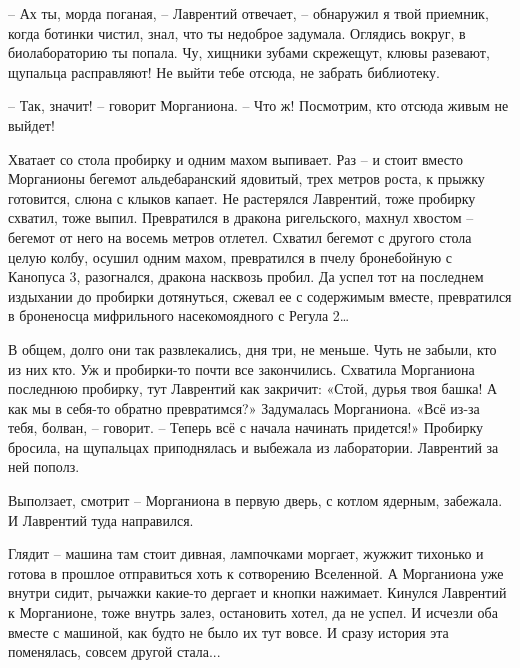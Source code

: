 \documentclass[ebook,oneside,final,openright]{memoir}
\begin{document}
– Ах ты, морда поганая, – Лаврентий отвечает, – обнаружил я твой приемник, когда ботинки чистил, знал, что ты недоброе задумала. Оглядись вокруг, в биолабораторию ты попала. Чу, хищники зубами скрежещут, клювы разевают, щупальца расправляют! Не выйти тебе отсюда, не забрать библиотеку.\par
– Так, значит! – говорит Морганиона. – Что ж! Посмотрим, кто отсюда живым не выйдет!\par
\par
Хватает со стола пробирку и одним махом выпивает. Раз – и стоит вместо Морганионы бегемот альдебаранский ядовитый, трех метров роста, к прыжку готовится, слюна с клыков капает. Не растерялся Лаврентий, тоже пробирку схватил, тоже выпил. Превратился в дракона ригельского, махнул хвостом – бегемот от него на восемь метров отлетел. Схватил бегемот с другого стола целую колбу, осушил одним махом, превратился в пчелу бронебойную с Канопуса 3, разогнался, дракона насквозь пробил. Да успел тот на последнем издыхании до пробирки дотянуться, сжевал ее с содержимым вместе, превратился в броненосца мифрильного насекомоядного с Регула 2…\par
\par
В общем, долго они так развлекались, дня три, не меньше. Чуть не забыли, кто из них кто. Уж и пробирки-то почти все закончились. Схватила Морганиона последнюю пробирку, тут Лаврентий как закричит: «Стой, дурья твоя башка! А как мы в себя-то обратно превратимся?» Задумалась Морганиона. «Всё из-за тебя, болван, – говорит. – Теперь всё с начала начинать придется!» Пробирку бросила, на щупальцах приподнялась и выбежала из лаборатории. Лаврентий за ней пополз.\par
\par
Выползает, смотрит – Морганиона в первую дверь, с котлом ядерным, забежала. И Лаврентий туда направился.\par
\par
Глядит – машина там стоит дивная, лампочками моргает, жужжит тихонько и готова в прошлое отправиться хоть к сотворению Вселенной. А Морганиона уже внутри сидит, рычажки какие-то дергает и кнопки нажимает. Кинулся Лаврентий к Морганионе, тоже внутрь залез, остановить хотел, да не успел. И исчезли оба вместе с машиной, как будто не было их тут вовсе. И сразу история эта поменялась, совсем другой стала...\par
\end{document}

